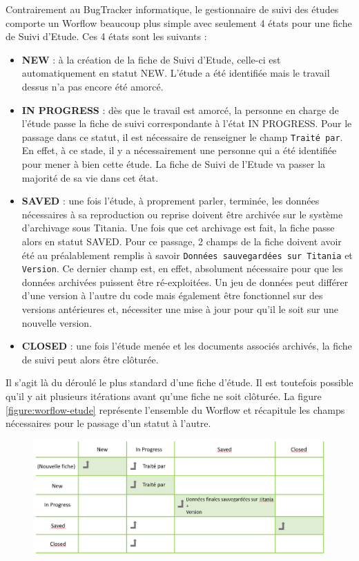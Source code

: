 Contrairement au BugTracker informatique, le gestionnaire de suivi des études comporte un Worflow beaucoup plus simple avec seulement 4 états pour une fiche de Suivi d'Etude. Ces 4 états sont les suivants :
\begin{itemize}[label=$\Rightarrow$, font=\LARGE]
   \item \textbf{NEW} : à la création de la fiche de Suivi d'Etude, celle-ci est automatiquement en statut NEW. L'étude a été identifiée mais le travail dessus n'a pas encore été amorcé.
   \item \textbf{IN PROGRESS} : dès que le travail est amorcé, la personne en charge de l'étude passe la fiche de suivi correspondante à l'état IN PROGRESS. Pour le passage dans ce statut, il est nécessaire de renseigner le champ \texttt{Traité par}. En effet, à ce stade, il y a nécessairement une personne qui a été identifiée pour mener à bien cette étude. La fiche de Suivi de l'Etude va passer la majorité de sa vie dans cet état.
   \item \textbf{SAVED} : une fois l'étude, à proprement parler, terminée, les données nécessaires à sa reproduction ou reprise doivent être archivée sur le système d'archivage sous Titania. Une fois que cet archivage est fait, la fiche passe alors en statut SAVED. Pour ce passage, 2 champs de la fiche doivent avoir été au préalablement remplis à savoir \texttt{Données sauvegardées sur Titania} et \texttt{Version}. Ce dernier champ est, en effet, absolument nécessaire pour que les données archivées puissent être ré-exploitées. Un jeu de données peut différer d'une version à l'autre du code mais également être fonctionnel sur des versions antérieures et, nécessiter une mise à jour pour qu'il le soit sur une nouvelle version.
   \item \textbf{CLOSED} : une fois l'étude menée et les documents associés archivés, la fiche de suivi peut alors être clôturée.
\end{itemize}

Il s'agit là du déroulé le plus standard d'une fiche d'étude. Il est toutefois possible qu'il y ait plusieurs itérations avant qu'une fiche ne soit clôturée. La figure \ref{figure:worflow-etude} représente l'ensemble du Worflow et récapitule les champs nécessaires pour le passage d'un statut à l'autre.\\
\vspace{0.1cm}
\begin{figure}[H]
   \centering
   \includegraphics[width=13cm]{pictures/worflow-etude.png}                        
   \vspace*{0.2cm}
\end{figure}
